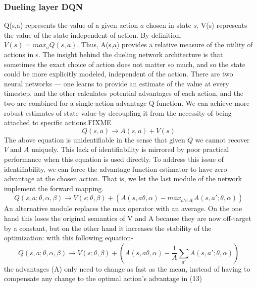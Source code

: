 \subsubsection{Dueling layer DQN}
Q(s,a) represents the value of a given action $a$ chosen in state $s$, V(s) represents the value of the state independent of action. By definition, $V(s)=max_{a}Q(s,a)$. Thus, A(s,a) provides a relative measure of the utility of actions in s. The insight behind the dueling network architecture is that sometimes the exact choice of action does not matter so much, and so the state could be more explicitly modeled, independent of the action. There are two neural networks — one learns to provide an estimate of the value at every timestep, and the other calculates potential advantages of each action, and the two are combined for a single action-advantage Q function. We can achieve more robust estimates of state value by decoupling it from the necessity of being attached to specific actions.FIXME%
\newline
\begin{equation}
Q(s,a) \rightarrow A(s,a) + V(s)
\end{equation}
The above equation is unidentifiable in the sense that given $Q$
we cannot recover $V$ and $A$ uniquely. This lack of identifiability is mirrored by poor practical performance when this equation is used directly. To address this issue of identifiability, we can force the advantage
function estimator to have zero advantage at the
chosen action. That is, we let the last module of the network
implement the forward mapping.
\begin{equation}
Q(s,a; \theta, \alpha, \beta) \rightarrow V(s; \theta, \beta) + (A(s,a\theta, \alpha) - max_{a' \epsilon |A|} A(s,a';\theta,\alpha ))
\end{equation}
An alternative module replaces the max operator with an
average. On the one hand this loses the original semantics of V and
A because they are now off-target by a constant, but on
the other hand it increases the stability of the optimization:
with this following equation-
\begin{equation}
Q(s,a; \theta, \alpha, \beta) \rightarrow V(s; \theta, \beta) + (A(s,a\theta, \alpha) - \frac{1}{A} \sum_{a'}^{} A(s,a';\theta,\alpha ))
\end{equation}
 the advantages (A) only need to change as fast as the
mean, instead of having to compensate any change to the
optimal action’s advantage in  (13)
\newline
 
